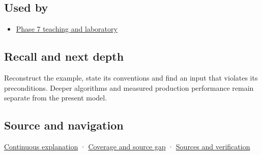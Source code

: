 \subsection{Used by}\label{appendix-1bfb7c657105-used-by}

\hypertarget{appendix-1bfb7c657105-used-by}{}

\begin{itemize}
\tightlist
\item
  \hyperref[01-foundations-i-ch018-keep-the-promises-visible-while-moving-between-representations]{Phase 7 teaching and laboratory}
\end{itemize}

\subsection{Recall and next depth}\label{appendix-1bfb7c657105-recall-and-next-depth}

\hypertarget{appendix-1bfb7c657105-recall-and-next-depth}{}

Reconstruct the example, state its conventions and find an input that violates its preconditions. Deeper algorithms and measured production performance remain separate from the present model.

\subsection{Source and navigation}\label{appendix-1bfb7c657105-source-and-navigation}

\hypertarget{appendix-1bfb7c657105-source-and-navigation}{}

\hyperref[01-foundations-i-ch018-keep-the-promises-visible-while-moving-between-representations]{Continuous explanation} · \hyperref[appendix-fd090d982a15-phase-7---parts-601-700]{Coverage and source gap} · \hyperref[appendix-a103e7846d21-phase-7---source-analysis-and-verification]{Sources and verification}
